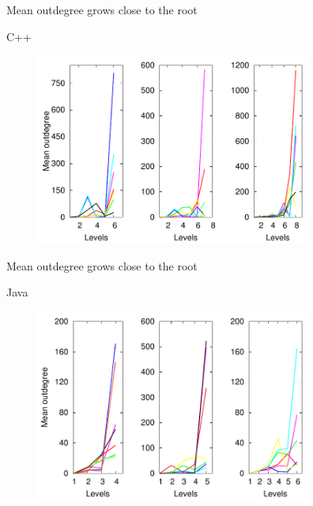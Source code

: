 \documentclass[11pt,svgnames]{beamer}
\begin{document}
\begin{frame}{Mean outdegree grows close to the root}%
\begin{tcolorbox}[colframe=red]
\center
 C++
\end{tcolorbox}
\begin{figure}[ht]%
\includegraphics[width=9cm,draft=false]{immagini/CPP_OvsD.pdf}
\end{figure}\end{frame}
\begin{frame}[noframenumbering]{Mean outdegree grows close to the root}%
\begin{tcolorbox}[colframe=green]
\center
 Java
\end{tcolorbox}
\begin{figure}[hp]%
\includegraphics[width=9cm,draft=false]{immagini/JAVA_OvsD.pdf}
\end{figure}
\end{frame}
\end{document}
